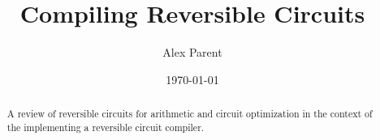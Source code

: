 \documentclass[article]{memoir}
\begin{document}
\listoftodos

\title{Compiling Reversible Circuits}
\author{Alex Parent}
\date{\today}
\maketitle

\begin{abstract}
  A review of reversible circuits for arithmetic and circuit optimization in the context of the implementing a reversible circuit compiler.
\end{abstract}
\setcounter{tocdepth}{1}
\tableofcontents








\end{document}
